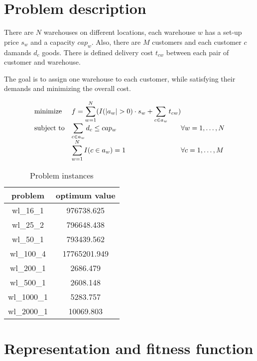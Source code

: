 \documentclass[./main.tex]{subfiles}
\begin{document}
\section{Problem description}
There are $N$ warehouses on different locations, each warehouse $w$ has a set-up price $s_w$ and a capacity $cap_w$.
Also, there are $M$ customers and each customer $c$ damands $d_c$ goods.
There is defined delivery cost $t_{cw}$ between each pair of customer and warehouse.

The goal is to assign one warehouse to each customer, while satisfying their demands and minimizing the overall cost.

\begin{equation}
    \begin{array}{ll @{} ll}
        \text{minimize}   & f = \displaystyle\sum_{w = 1}^{N}(I(|a_w| > 0) \cdot s_w + \sum_{c \in a_w} t_{cw}) & \\
        \text{subject to} & \displaystyle\sum_{c \in a_w} d_c \leq cap_w & \forall w = 1, \dots, N \\
                          & \displaystyle\sum_{w = 1}^{N} I(c \in a_w) = 1 & \forall c = 1, \dots, M \\
    \end{array}
\end{equation}

\begin{table}[ht]
    \centering
    \begin{tabular}{c | c}
        problem & optimum value \\
        \hline
        wl\_16\_1 & 976738.625 \\
        wl\_25\_2 & 796648.438 \\
        wl\_50\_1 & 793439.562 \\
        wl\_100\_4 & 17765201.949 \\
        wl\_200\_1 & 2686.479 \\
        wl\_500\_1 & 2608.148 \\
        wl\_1000\_1 & 5283.757 \\
        wl\_2000\_1 & 10069.803 \\
    \end{tabular}
    \caption{Problem instances}
\end{table}

\section{Representation and fitness function}
\end{document}
